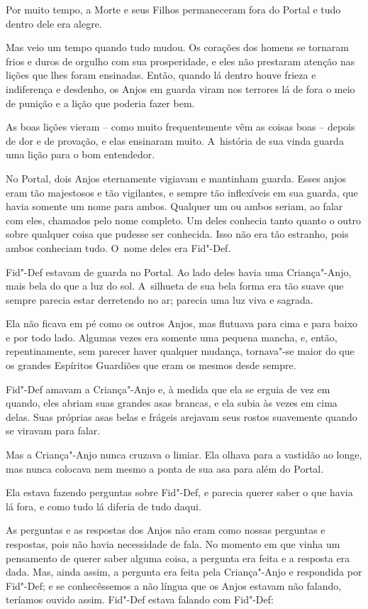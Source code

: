 Por muito tempo, a Morte e seus Filhos permaneceram fora do Portal e
tudo dentro dele era alegre.

Mas veio um tempo quando tudo mudou. Os corações dos homens se tornaram
frios e duros de orgulho com sua prosperidade, e eles não prestaram
atenção nas lições que lhes foram ensinadas. Então, quando lá dentro
houve frieza e indiferença e desdenho, os Anjos em guarda viram nos
terrores lá de fora o meio de punição e a lição que poderia fazer bem.

As boas lições vieram -- como muito frequentemente vêm as coisas boas --
depois de dor e de provação, e elas ensinaram muito. A~história de sua
vinda guarda uma lição para o bom entendedor.

No Portal, dois Anjos eternamente vigiavam e mantinham guarda. Esses
anjos eram tão majestosos e tão vigilantes, e sempre tão inflexíveis em
sua guarda, que havia somente um nome para ambos. Qualquer um ou ambos
seriam, ao falar com eles, chamados pelo nome completo. Um deles
conhecia tanto quanto o outro sobre qualquer coisa que pudesse ser
conhecida. Isso não era tão estranho, pois ambos conheciam tudo. O~nome
deles era Fid"-Def.

Fid"-Def estavam de guarda no Portal. Ao lado deles havia uma
Criança"-Anjo, mais bela do que a luz do sol. A~silhueta de sua bela
forma era tão suave que sempre parecia estar derretendo no ar; parecia
uma luz viva e sagrada.

Ela não ficava em pé como os outros Anjos, mas flutuava para cima e para
baixo e por todo lado. Algumas vezes era somente uma pequena mancha, e,
então, repentinamente, sem parecer haver qualquer mudança, tornava"-se
maior do que os grandes Espíritos Guardiões que eram os mesmos desde
sempre.

Fid"-Def amavam a Criança"-Anjo e, à medida que ela se erguia de vez em
quando, eles abriam suas grandes asas brancas, e ela subia às vezes em
cima delas. Suas próprias asas belas e frágeis arejavam seus rostos
suavemente quando se viravam para falar.

Mas a Criança"-Anjo nunca cruzava o limiar. Ela olhava para a vastidão ao
longe, mas nunca colocava nem mesmo a ponta de sua asa para além do
Portal.

Ela estava fazendo perguntas sobre Fid"-Def, e parecia querer saber o que
havia lá fora, e como tudo lá diferia de tudo daqui.

As perguntas e as respostas dos Anjos não eram como nossas perguntas e
respostas, pois não havia necessidade de fala. No momento em que vinha
um pensamento de querer saber alguma coisa, a pergunta era feita e a
resposta era dada. Mas, ainda assim, a pergunta era feita pela
Criança"-Anjo e respondida por Fid"-Def; e se conhecêssemos a não língua
que os Anjos estavam não falando, teríamos ouvido assim. Fid"-Def estava
falando com Fid"-Def:

